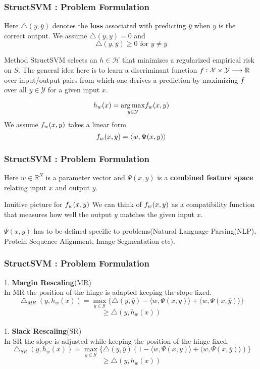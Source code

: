 \documentclass[a4paper,compress,svgnames]{beamer}
\begin{document}
\begin{frame}
\frametitle{StructSVM : Problem Formulation}
Here $\bigtriangleup(y, \overline{y})$ denotes the \textbf{loss} associated with predicting $\overline{y}$ when $y$ is the correct output. We assume $\bigtriangleup(y,y) = 0 $ and 
\[ \bigtriangleup(y, \overline{y}) \geq 0 \textrm{ for } y \neq \overline{y} \]
\begin{block}{Method}
StructSVM selects an $h \in \mathcal{H}$ that minimizes a regularized empirical risk\\
on $S$. The general idea here is to learn a discriminant function $\mathnormal{f} : \mathcal{X} \times \mathcal{Y} \longrightarrow \mathbb{R}$ over input/output pairs from which one derives a prediction by maximizing $\mathnormal{f}$ over all $y \in \mathcal{Y}$ for a given input $x$.
\end{block}
\[ h_w(x) =  \underset{y \in \mathcal{Y}}{\arg\max} \mathnormal{f}_w(x,y) \]
We assume $\mathnormal{f}_w(x,y)$ takes a linear form
\[ \mathnormal{f}_w(x,y) = \langle w , \Psi(x,y) \rangle \]
\end{frame}

\begin{frame}
\frametitle{StructSVM : Problem Formulation}
Here $w \in \mathbb{R}^N$ is a parameter vector and $\Psi(x,y)$ is a \textbf{combined feature space} relating input $x$ and output $y$.
\begin{block}{Inuitive picture for $\mathnormal{f}_w(x,y)$}
We can think of $\mathnormal{f}_w(x,y)$ as a compatibility function that measures how well the output $y$ matches the given input $x$.
\end{block}
\vspace{0.2in}
$\Psi(x,y)$ has to be defined specific to problems(Natural Language Parsing(NLP), Protein Sequence Alignment, Image Segmentation etc).\\
\end{frame}

\begin{frame}
\frametitle{StructSVM : Problem Formulation}
1. \textbf{Margin Rescaling}(MR)\\
In MR the position of the hinge is adapted keeping the slope fixed. 
\[ \bigtriangleup_{MR}(y, h_w(x)) =  \underset{\overline{y} \in \mathcal{Y}}{\max}\{ \bigtriangleup(y, \overline{y}) - \langle w , \Psi(x,y) \rangle + \langle w , \Psi(x,\overline{y}) \rangle \} \]
\[ \geq \bigtriangleup(y, h_w(x)) \] \\
\vspace{0.2in}
1. \textbf{Slack Rescaling}(SR)\\
In SR the slope is adjusted while keeping the position of the hinge fixed.
\[ \bigtriangleup_{SR}(y, h_w(x)) =  \underset{\overline{y} \in \mathcal{Y}}{\max}\{ \bigtriangleup(y, \overline{y})(1 - \langle w , \Psi(x,y) \rangle + \langle w , \Psi(x,\overline{y}) \rangle) \} \]
\[ \geq \bigtriangleup(y, h_w(x)) \]
\end{frame}
\end{document}

